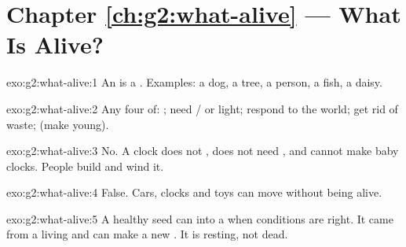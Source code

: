 \section*{Chapter \ref{ch:g2:what-alive} --- What Is Alive?}

\begin{solution}{exo:g2:what-alive:1}
An  is a . Examples: a dog, a tree, a person, a
fish, a daisy.
\end{solution}

\begin{solution}{exo:g2:what-alive:2}
Any four of: ; need / or light; respond to the world;
get rid of waste;  (make young).
\end{solution}

\begin{solution}{exo:g2:what-alive:3}
No. A clock does not , does not need , and cannot make baby
clocks. People build and wind it.
\end{solution}

\begin{solution}{exo:g2:what-alive:4}
False. Cars, clocks and toys can move without being alive.
\end{solution}

\begin{solution}{exo:g2:what-alive:5}
A healthy seed can  into a  when conditions are right. It
came from a living  and can make a new . It is resting,
not dead.
\end{solution}

